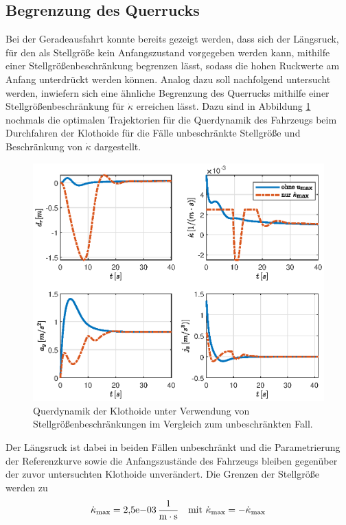 \subsection{Begrenzung des Querrucks}
Bei der Geradeausfahrt konnte bereits gezeigt werden, dass sich der Längsruck, für den als Stellgröße kein Anfangszustand vorgegeben werden kann, mithilfe einer Stellgrößenbeschränkung begrenzen lässt, sodass die hohen Ruckwerte am Anfang unterdrückt werden können. Analog dazu soll nachfolgend untersucht werden, inwiefern sich eine ähnliche Begrenzung des Querrucks mithilfe einer Stellgrößenbeschränkung für $\dot{\kappa}$ erreichen lässt. Dazu sind in Abbildung \ref{fig:lat_dyn_klothoide_umax} nochmals die optimalen Trajektorien für die Querdynamik des Fahrzeugs beim Durchfahren der Klothoide für die Fälle unbeschränkte Stellgröße und Beschränkung von $\dot{\kappa}$ dargestellt. 
\begin{figure}[h] 
	\centering
	\includegraphics[width=\linewidth]{./Bilder/Ergebnisse/Klothoide/nur_dkappa_max/lat_dyn.eps}
	\caption{Querdynamik der Klothoide unter Verwendung von Stellgrößenbeschränkungen im Vergleich zum unbeschränkten Fall.}
	\label{fig:lat_dyn_klothoide_umax}
\end{figure}
Der Längsruck ist dabei in beiden Fällen unbeschränkt und die Parametrierung der Referenzkurve sowie die Anfangszustände des Fahrzeugs bleiben gegenüber der zuvor untersuchten Klothoide unverändert. Die Grenzen der Stellgröße werden zu 
\begin{equation}
	\dot{\kappa}_{\textrm{max}} = 2{,}5\textrm{e}{-03}\,\mathrm{\frac{\mathrm{1}}{\mathrm{m\cdot s}}} \quad\textrm{mit~} \dot{\kappa}_{\textrm{max}} = -\dot{\kappa}_{\textrm{max}}
\end{equation}
